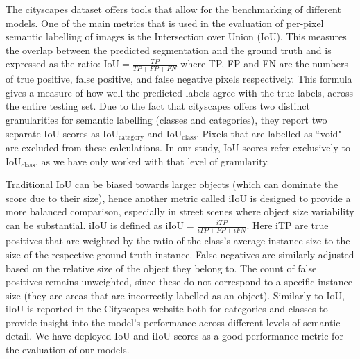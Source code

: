 The cityscapes dataset offers tools that allow for the benchmarking of different models. One of the main metrics that is used in the evaluation of per-pixel semantic labelling of images is the Intersection over Union (IoU). This measures the overlap between the predicted segmentation and the ground truth and is expressed as the ratio: $\text{IoU} = \frac{TP}{TP + FP + FN}$ where TP, FP and FN are the numbers of true positive, false positive, and false negative pixels respectively. This formula gives a measure of how well the predicted labels agree with the true labels, across the entire testing set. Due to the fact that cityscapes offers two distinct granularities for semantic labelling (classes and categories), they report two separate IoU scores as IoU$_\text{category}$ and IoU$_\text{class}$. Pixels that are labelled as ``void" are excluded from these calculations. In our study, IoU scores refer exclusively to IoU$_\text{class}$, as we have only worked with that level of granularity.

Traditional IoU can be biased towards larger objects (which can dominate the score due to their size), hence another metric called iIoU is designed to provide a more balanced comparison, especially in street scenes where object size variability can be substantial. iIoU is defined as $\text{iIoU} = \frac{iTP}{iTP + FP + iFN}$. Here iTP are true positives that are weighted by the ratio of the class's average instance size to the size of the respective ground truth instance. False negatives are similarly adjusted based on the relative size of the object they belong to. The count of false positives remains unweighted, since these do not correspond to a specific instance size (they are areas that are incorrectly labelled as an object). Similarly to IoU, iIoU is reported in the Cityscapes website both for categories and classes to provide insight into the model's performance across different levels of semantic detail. We have deployed IoU and iIoU scores as a good performance metric for the evaluation of our models. 